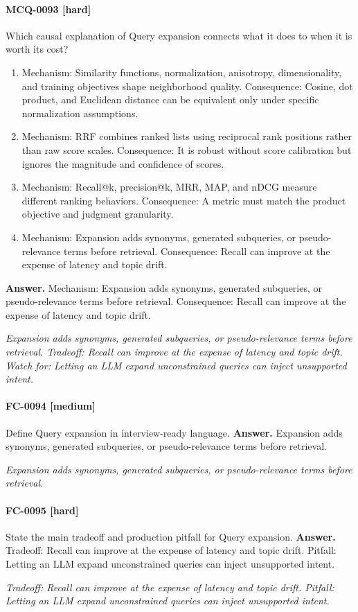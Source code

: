 \paragraph{MCQ-0093 [hard]} Which causal explanation of Query expansion connects what it does to when it is worth its cost?
\begin{enumerate}[label=\Alph*.]
\item Mechanism: Similarity functions, normalization, anisotropy, dimensionality, and training objectives shape neighborhood quality. Consequence: Cosine, dot product, and Euclidean distance can be equivalent only under specific normalization assumptions.
\item Mechanism: RRF combines ranked lists using reciprocal rank positions rather than raw score scales. Consequence: It is robust without score calibration but ignores the magnitude and confidence of scores.
\item Mechanism: Recall@k, precision@k, MRR, MAP, and nDCG measure different ranking behaviors. Consequence: A metric must match the product objective and judgment granularity.
\item Mechanism: Expansion adds synonyms, generated subqueries, or pseudo-relevance terms before retrieval. Consequence: Recall can improve at the expense of latency and topic drift.
\end{enumerate}
\noindent\textbf{Answer.} Mechanism: Expansion adds synonyms, generated subqueries, or pseudo-relevance terms before retrieval. Consequence: Recall can improve at the expense of latency and topic drift.
\par\textit{Expansion adds synonyms, generated subqueries, or pseudo-relevance terms before retrieval. Tradeoff: Recall can improve at the expense of latency and topic drift. Watch for: Letting an LLM expand unconstrained queries can inject unsupported intent.}
\paragraph{FC-0094 [medium]} Define Query expansion in interview-ready language.
\noindent\textbf{Answer.} Expansion adds synonyms, generated subqueries, or pseudo-relevance terms before retrieval.
\par\textit{Expansion adds synonyms, generated subqueries, or pseudo-relevance terms before retrieval.}
\paragraph{FC-0095 [hard]} State the main tradeoff and production pitfall for Query expansion.
\noindent\textbf{Answer.} Tradeoff: Recall can improve at the expense of latency and topic drift. Pitfall: Letting an LLM expand unconstrained queries can inject unsupported intent.
\par\textit{Tradeoff: Recall can improve at the expense of latency and topic drift. Pitfall: Letting an LLM expand unconstrained queries can inject unsupported intent.}
